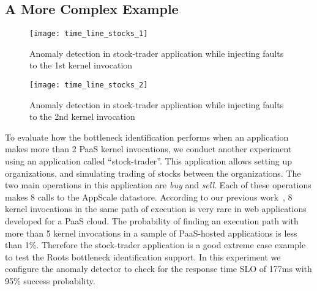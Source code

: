 
\subsection{A More Complex Example}

\begin{figure}
\texttt{[image: time\_line\_stocks\_1]}
\caption{Anomaly detection in stock-trader application while injecting faults to the 1st kernel invocation 
}
\vspace{-0.1in}
\label{fig:time_line_stocks_1}
\end{figure}

\begin{figure}
\texttt{[image: time\_line\_stocks\_2]}
\caption{Anomaly detection in stock-trader application while injecting faults to the 2nd kernel invocation}
\vspace{-0.1in}
\label{fig:time_line_stocks_2}
\end{figure}

To evaluate how the bottleneck identification performs when an application makes more than 2
PaaS kernel invocations, we conduct another experiment using an application
called ``stock-trader''.
This application allows setting up organizations, and simulating trading of stocks between the
organizations. The two main operations in this application are \textit{buy} and \textit{sell}. Each of
these operations makes 8 calls to the AppScale datastore. 
According to our previous work~\cite{Jayathilaka:2015:RTS:2806777.2806842}, 8 kernel invocations in the
same path of execution is very rare in web applications developed for a PaaS cloud. The probability
of finding an execution path with more than 5 kernel invocations in a sample of PaaS-hosted
applications is less than 1\%. Therefore the stock-trader application is a good extreme case
example to test the Roots bottleneck identification support.
In this experiment we configure the anomaly
detector to check for the response time SLO of 177ms with 95\% success probability.

